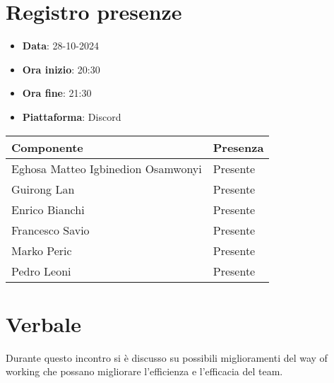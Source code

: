 \documentclass[a4paper, 12pt]{article}
\begin{document}
\section{Registro presenze}
\begin{itemize}
    \item[] \textbf{Data}: 28-10-2024
    \item[] \textbf{Ora inizio}:  20:30
    \item[] \textbf{Ora fine}: 21:30
    \item[] \textbf{Piattaforma}: Discord
\end{itemize}
\begin{table}[!h]
\centering
{\renewcommand{\arraystretch}{2}
\begin{tabularx}{\textwidth}{| X | X |}
    \hline
        \textbf{\large Componente} & 
        \textbf{\large Presenza} \\ 
    \hline 
    \hline
        Eghosa Matteo Igbinedion Osamwonyi&
        Presente \\
    \hline 
        Guirong Lan&
        Presente \\
    \hline 
        Enrico Bianchi&
        Presente \\
    \hline 
        Francesco Savio&
        Presente \\
    \hline 
        Marko Peric&
        Presente \\
    \hline 
        Pedro Leoni&
        Presente \\
    \hline  

\end{tabularx}}
\end{table}

\newpage

\section{Verbale}
Durante questo incontro si è discusso su possibili miglioramenti del way of working che possano migliorare l’efficienza e l’efficacia del team.
\end{document}
